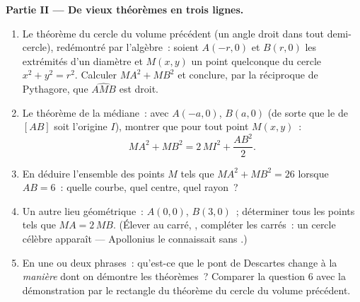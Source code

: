 \begin{problem}
\medskip
\noindent\textbf{Partie II --- De vieux théorèmes en trois lignes.}
\begin{enumerate}[resume]
  \item Le théorème du cercle du volume précédent (un angle droit
        dans tout demi-cercle), redémontré par l'algèbre~: soient
        $A(-r, 0)$ et $B(r, 0)$ les extrémités d'un diamètre et
        $M(x, y)$ un point quelconque du cercle $x^2 + y^2 = r^2$.
        Calculer $MA^2 + MB^2$ et conclure, par la réciproque de
        Pythagore, que $\widehat{AMB}$ est droit.
  \item Le théorème de la médiane~: avec $A(-a, 0)$, $B(a, 0)$ (de
        sorte que le  de $[AB]$ soit l'origine $I$), montrer
        que pour tout point $M(x, y)$~:
        \[
        MA^2 + MB^2 = 2\,MI^2 + \frac{AB^2}{2} .
        \]
  \item En déduire l'ensemble des points $M$ tels que
        $MA^2 + MB^2 = 26$ lorsque $AB = 6$~: quelle courbe, quel
        centre, quel rayon~?
  \item Un autre lieu géométrique~: $A(0,0)$, $B(3,0)$~; déterminer
        tous les points tels que $MA = 2\,MB$. (Élever au carré,
        , compléter les carrés~: un cercle célèbre
        apparaît --- Apollonius le connaissait sans .)
  \item En une ou deux phrases~: qu'est-ce que le pont de Descartes
        change à la \emph{manière} dont on démontre les théorèmes~?
        Comparer la question 6 avec la démonstration par le
        rectangle du théorème du cercle du volume précédent.
\end{enumerate}


\end{problem}
